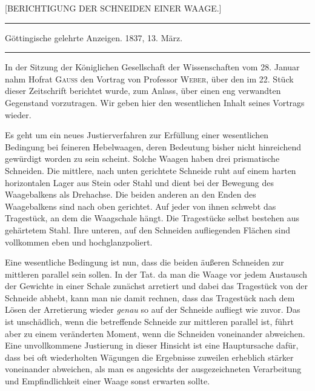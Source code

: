 \begin{center}
{\Large [BERICHTIGUNG DER SCHNEIDEN EINER WAAGE.]\par}
\vspace{7mm}\hrule\vspace{2mm}
Göttingische gelehrte Anzeigen. 1837, 13. März.
\vspace{2mm}\hrule\vspace{5mm}
\end{center}
In der Sitzung der Königlichen Gesellschaft der Wissenschaften vom 28. Januar nahm Hofrat \textsc{Gauss} den Vortrag von Professor \textsc{Weber}, über den im 22. Stück dieser Zeitschrift berichtet wurde, zum Anlass, über einen eng verwandten Gegenstand vorzutragen. Wir geben hier den wesentlichen Inhalt seines Vortrags wieder.

Es geht um ein neues Justierverfahren zur Erfüllung einer wesent\-lichen Bedingung bei feineren Hebelwaagen, deren Bedeutung bisher nicht hinreichend gewürdigt worden zu sein scheint. Solche Waagen haben drei prismatische Schneiden. Die mittlere, nach unten gerichtete Schneide ruht auf einem harten horizontalen Lager aus Stein oder Stahl und dient bei der Bewegung des Waagebalkens als Drehachse. Die beiden anderen an den Enden des Waagebalkens sind nach oben gerichtet. Auf jeder von ihnen schwebt das Tragestück, an dem die Waagschale hängt. Die Tragestücke selbst bestehen aus gehärtetem Stahl. Ihre unteren, auf den Schneiden aufliegenden Flächen sind vollkommen eben und hochglanzpoliert.

Eine wesentliche Bedingung ist nun, dass die beiden äußeren Schneiden zur mittleren parallel sein sollen. In der Tat. da man die Waage vor jedem Austausch der Gewichte in einer Schale zunächst arretiert und dabei das Tragestück von der Schneide abhebt, kann man nie damit rechnen, dass das Tragestück nach dem Lösen der Arretierung wieder \textit{genau} so auf der Schneide aufliegt wie zuvor. Das ist unschädlich, wenn die betreffende Schneide zur mittleren parallel ist, führt aber zu einem veränderten Moment, wenn die Schneiden voneinander abweichen. Eine unvollkommene Justierung in dieser Hinsicht ist eine Hauptursache dafür, dass bei oft wiederholten Wägungen die Ergebnisse zuweilen erheblich stärker voneinander abweichen, als man
es angesichts der ausgezeichneten Verarbeitung und Empfindlichkeit einer Waage sonst erwarten sollte.

